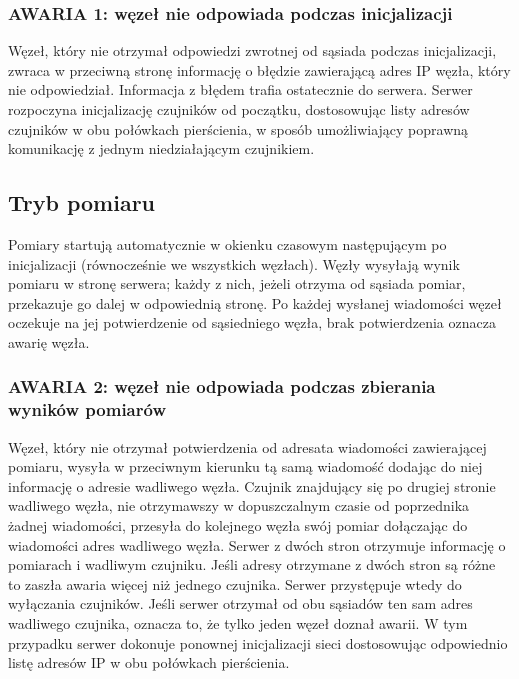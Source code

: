 \documentclass[a4paper,11pt]{article}
\begin{document}
\subsubsection{AWARIA 1: węzeł nie odpowiada podczas inicjalizacji}
Węzeł, który nie otrzymał odpowiedzi zwrotnej od sąsiada podczas inicjalizacji,
zwraca w przeciwną stronę informację o błędzie zawierającą adres IP węzła, który nie odpowiedział.
Informacja z błędem trafia ostatecznie do serwera.
Serwer rozpoczyna inicjalizację czujników od początku,
dostosowując listy adresów czujników w obu połówkach pierścienia,
w sposób umożliwiający poprawną komunikację z jednym niedziałającym czujnikiem.

\subsection{Tryb pomiaru}
Pomiary startują automatycznie w okienku czasowym następującym po inicjalizacji
(równocześnie we wszystkich węzłach).
Węzły wysyłają wynik pomiaru w stronę serwera; każdy z nich, jeżeli otrzyma od sąsiada pomiar, przekazuje go dalej w odpowiednią stronę.
Po każdej wysłanej wiadomości węzeł oczekuje na jej potwierdzenie od sąsiedniego węzła, brak potwierdzenia oznacza awarię węzła.

\subsubsection{AWARIA 2: węzeł nie odpowiada podczas zbierania wyników pomiarów}
Węzeł, który nie otrzymał potwierdzenia od adresata wiadomości zawierającej pomiaru,
wysyła w przeciwnym kierunku tą samą wiadomość dodając do niej informację o adresie wadliwego węzła.
Czujnik znajdujący się po drugiej stronie wadliwego węzła,
nie otrzymawszy w dopuszczalnym czasie od poprzednika żadnej wiadomości,
przesyła do kolejnego węzła swój pomiar dołączając do wiadomości adres wadliwego węzła.
Serwer z dwóch stron otrzymuje informację o pomiarach i wadliwym czujniku.
Jeśli adresy otrzymane z dwóch stron są różne to zaszła awaria więcej niż jednego czujnika.
Serwer przystępuje wtedy do wyłączania czujników. Jeśli serwer otrzymał od obu sąsiadów
ten sam adres wadliwego czujnika, oznacza to, że tylko jeden węzeł doznał awarii.
W tym przypadku serwer dokonuje ponownej inicjalizacji sieci dostosowując odpowiednio listę
adresów IP w obu połówkach pierścienia.

\end{document}
